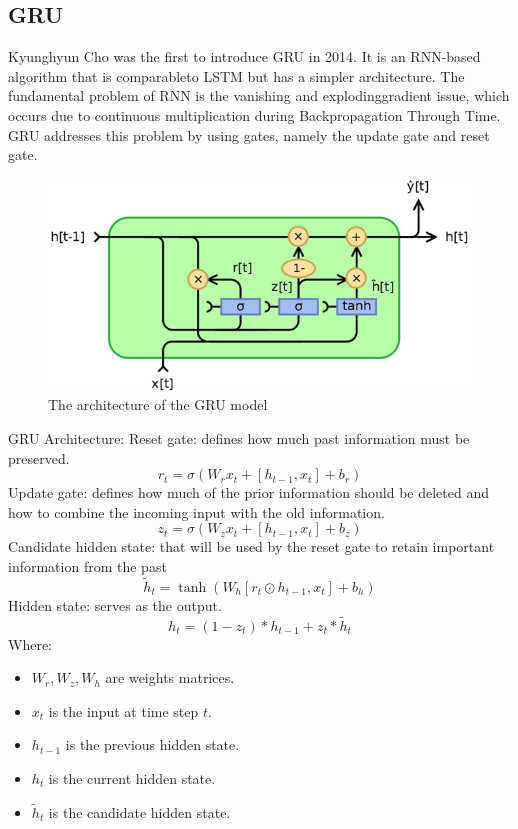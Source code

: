 \documentclass[conference]{IEEEtran}
\begin{document}
\subsection{GRU}
Kyunghyun Cho was the first to introduce GRU in 2014. It is an RNN-based algorithm that is comparableto LSTM but has a simpler architecture. The fundamental problem of RNN is the vanishing and explodinggradient issue, which occurs due to continuous multiplication during Backpropagation Through Time. GRU addresses this problem by using gates, namely the update gate and reset gate.\cite{ComparisonGRU&ARIMA}
\begin{figure}[H]
    \centering
    \begin{minipage}{0.8\linewidth}
    \centering
        \includegraphics[width=\linewidth]{images/GRU.png}
    \caption{The architecture of the GRU model}
    \label{fig8}
    \end{minipage}
\end{figure}
GRU Architecture:
Reset gate: defines how much past information must be preserved.
\[r_t = \sigma(W_r x_t + [h_{t-1}, x_t] + b_r)\]
Update gate: defines how much of the prior information should be deleted and how to combine the incoming input with the old information.
\[z_t = \sigma(W_z x_t + [h_{t-1}, x_t] + b_z)\]
Candidate hidden state: that will be used by the reset gate to retain important information from the past
\[\tilde{h}_t = \tanh(W_h [r_t \odot h_{t-1}, x_t] + b_h)\]
Hidden state: serves as the output.
\[h_t = (1 - z_t) * h_{t-1} + z_t * \tilde{h}_t\]
Where:
\begin{itemize}
    \item $W_r, W_z, W_h$ are weights matrices.
    \item $x_t$ is the input at time step $t$.
    \item $h_{t-1}$ is the previous hidden state.
    \item $h_t$ is the current hidden state.
    \item $\tilde{h}_t$ is the candidate hidden state.
\end{itemize}
\end{document}
